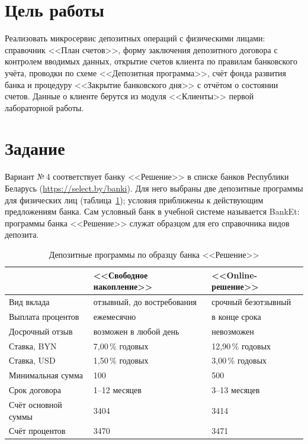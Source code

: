 \documentclass[14pt,a4paper]{extarticle}
\begin{document}

\tableofcontents

\section{Цель работы}

Реализовать микросервис депозитных операций с физическими лицами: справочник <<План
счетов>>, форму заключения депозитного договора с контролем вводимых данных, открытие
счетов клиента по правилам банковского учёта, проводки по схеме <<Депозитная программа>>,
счёт фонда развития банка и процедуру <<Закрытие банковского дня>> с отчётом о состоянии
счетов. Данные о клиенте берутся из модуля <<Клиенты>> первой лабораторной работы.

\section{Задание}

Вариант №\,4 соответствует банку <<Решение>> в списке банков Республики Беларусь
(\url{https://select.by/banki}). Для него выбраны две депозитные программы для физических
лиц (таблица~\ref{tab:products}); условия приближены к действующим предложениям банка.
Сам условный банк в учебной системе называется BankEt: программы банка <<Решение>> служат
образцом для его справочника видов депозита.

\begin{table}[H]
\caption{Депозитные программы по образцу банка <<Решение>>}
\label{tab:products}
\centering
\small
\begin{tabularx}{\textwidth}{lXX}
\toprule
 & <<Свободное накопление>> & <<Online-решение>> \\
\midrule
Вид вклада & отзывный, до востребования & срочный безотзывный \\
Выплата процентов & ежемесячно & в конце срока \\
Досрочный отзыв & возможен в любой день & невозможен \\
Ставка, BYN & 7,00\,\% годовых & 12,90\,\% годовых \\
Ставка, USD & 1,50\,\% годовых & 3,00\,\% годовых \\
Минимальная сумма & 100 & 500 \\
Срок договора & 1--12 месяцев & 3--13 месяцев \\
Счёт основной суммы & 3404 & 3414 \\
Счёт процентов & 3470 & 3471 \\
\bottomrule
\end{tabularx}
\end{table}
\end{document}
